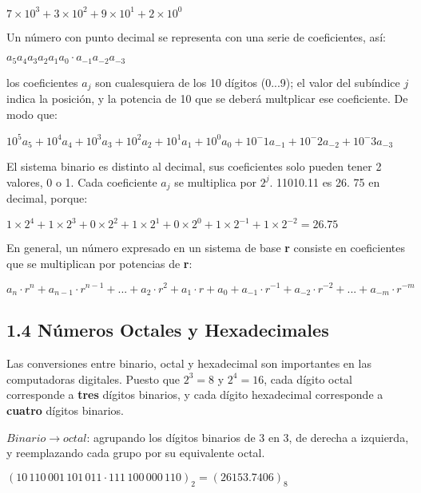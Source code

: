\begin{center}
    $7 \times 10^3 + 3 \times 10^2 + 9 \times 10^1 + 2 \times 10^0$
\end{center}

Un n\'{u}mero con punto decimal se representa con una serie de coeficientes,
as\'{i}:

\begin{center}
    \large
    $a_5a_4a_3a_2a_1a_0 \cdot a_{-1}a_{-2}a_{-3}$
\end{center}

los coeficientes $a_j$ son cualesquiera de los 10 d\'{i}gitos (0...9); el valor
del sub\'{i}ndice $j$ indica la posici\'{o}n, y la potencia de 10 que se
deber\'{a} multplicar ese coeficiente. De modo que:

\begin{center}
    $10^5a_5 + 10^4a_4 + 10^3a_3 + 10^2a_2 + 10^1a_1 + 10^0a_0 + 10^-1a_{-1} + 10^-2a_{-2} + 10^-3a_{-3}$
\end{center}

El sistema binario es distinto al decimal, sus coeficientes solo pueden tener 2
valores, 0 o 1. Cada coeficiente $a_j$ se multiplica por $2^j$. 11010.11 es 26.
75 en decimal, porque:

\begin{center}
    $1 \times 2^4 + 1 \times 2^3 + 0 \times 2^2 + 1 \times 2^1 + 0 \times 2^0 + 1 \times 2^{-1} + 1 \times 2^{-2} = 26.75$
\end{center}

En general, un n\'{u}mero expresado en un sistema de base \textbf{r} consiste
en coeficientes que se multiplican por potencias de \textbf{r}:

\begin{center}
    $a_n \cdot r^n + a_{n-1} \cdot r^{n-1} +...+ a_2 \cdot r^2 + a_1 \cdot r + a_0 + a_{-1} \cdot r^{-1} + a_{-2} \cdot r^{-2} +...+ a_{-m} \cdot r^{-m}$
\end{center}

\subsection*{1.4 N\'{u}meros Octales y Hexadecimales}
Las conversiones entre binario, octal y hexadecimal son importantes en las
computadoras digitales. Puesto que $2^3 = 8$ y $2^4 = 16$, cada d\'{i}gito octal
corresponde a \textbf{tres} d\'{i}gitos binarios, y cada d\'{i}gito hexadecimal
corresponde a \textbf{cuatro} d\'{i}gitos binarios.

$Binario \rightarrow octal$: agrupando los d\'{i}gitos binarios de 3 en 3, de
derecha a izquierda, y reemplazando cada grupo por su equivalente octal.
\begin{center}
    \large
    $(10\,110\,001\,101\,011 \cdot 111\,100\,000\,110)_2 = (26153.7406)_8$
\end{center}

